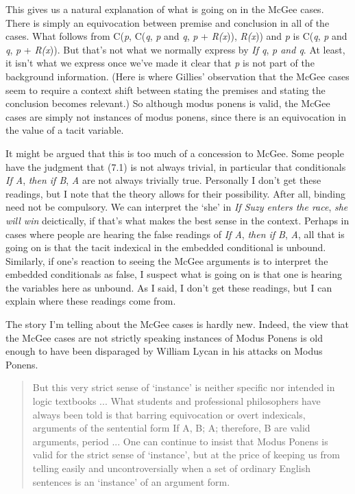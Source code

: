 This gives us a natural explanation of what is going on in the McGee cases. There is simply an equivocation between premise and conclusion in all of the cases. What follows from C(\textit{p}, C(\textit{q}, \textit{p} and \textit{q}, \textit{p} + \textit{R(x})), \textit{R(x})) and \textit{p} is C(\textit{q}, \textit{p} and \textit{q}, \textit{p} + \textit{R(x})). But that's not what we normally express by \textit{If q}, \textit{p and q}. At least, it isn't what we express once we've made it clear that \textit{p} is not part of the background information. (Here is where Gillies' observation that the McGee cases seem to require a context shift between stating the premises and stating the conclusion becomes relevant.) So although modus ponens is valid, the McGee cases are simply not instances of modus ponens, since there is an equivocation in the value of a tacit variable.

It might be argued that this is too much of a concession to McGee. Some people have the judgment that (7.1) is not always trivial, in particular that conditionals \textit{If A}, \textit{then if B}, \textit{A} are not always trivially true. Personally I don't get these readings, but I note that the theory allows for their possibility. After all, binding need not be compulsory. We can interpret the `she' in \textit{If Suzy enters the race}, \textit{she will win} deictically, if that's what makes the best sense in the context. Perhaps in cases where people are hearing the false readings of \textit{If A}, \textit{then if B}, \textit{A}, all that is going on is that the tacit indexical in the embedded conditional is unbound. Similarly, if one's reaction to seeing the McGee arguments is to interpret the embedded conditionals as false, I suspect what is going on is that one is hearing the variables here as unbound. As I said, I don't get these readings, but I can explain where these readings come from.

The story I'm telling about the McGee cases is hardly new. Indeed, the view that the McGee cases are not strictly speaking instances of Modus Ponens is old enough to have been disparaged by William Lycan in his attacks on Modus Ponens.

\begin{quote}
But this very strict sense of `instance' is neither specific nor intended in logic textbooks ... What students and professional philosophers have always been told is that barring equivocation or overt indexicals, arguments of the sentential form If A, B; A; therefore, B are valid arguments, period ... One can continue to insist that Modus Ponens is valid for the strict sense of `instance', but at the price of keeping us from telling easily and uncontroversially when a set of ordinary English sentences is an `instance' of an argument form. \cite[424, notation slightly altered]{Lycan1993}
\end{quote}

